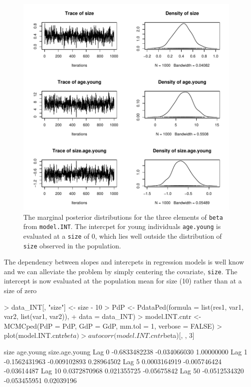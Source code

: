 \documentclass{article}
\begin{document}
\begin{figure}[!h]
\begin{center}
\includegraphics{Tutorial-057}
\end{center}
\caption{The marginal posterior distributions for the three elements of \texttt{beta} from \texttt{model.INT}.  The intercpet for young individuals \texttt{age.young} is evaluated at a \texttt{size} of 0, which lies well outside the distribution of \texttt{size} observed in the population.}
\label{INT-fig}
\end{figure}

The dependency between slopes and intercpets in regression models is well know and we can alleviate the problem by simply centering the covariate, \texttt{size}.  The intercept is now evaluated at the population mean for size (10) rather than at a size of zero

\begin{Schunk}
\begin{Sinput}
> data_INT[, "size"] <- size - 10
> PdP <- PdataPed(formula = list(res1, var1, var2, list(var1, var2)), 
+     data = data_INT)
> model.INT.cntr <- MCMCped(PdP = PdP, GdP = GdP, mm.tol = 1, verbose = FALSE)
> plot(model.INT.cntr$beta)
> autocorr(model.INT.cntr$beta)[, , 3]
\end{Sinput}
\begin{Soutput}
                size    age.young size.age.young
Lag 0  -0.6833482238 -0.034066030     1.00000000
Lag 1  -0.1562431963 -0.009102893     0.28964502
Lag 5   0.0003164919 -0.005746424    -0.03614487
Lag 10  0.0372870968  0.021355725    -0.05675842
Lag 50 -0.0512534320 -0.053455951     0.02039196
\end{Soutput}
\end{Schunk}
\end{document}
